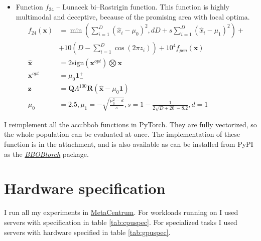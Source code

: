 \begin{itemize}
\begin{align*}
\begin{array}{ll}
\begin{array}{l}
                        \text{sampled randomly without} \\
                        \text{replacement for}\ i \neq 1
                    \end{array}
            \end{array}
        \right.
    \end{align*}
    \item Function $f_{24}$ -- Lunacek bi--Rastrigin function. This function is highly multimodal and deceptive, because of the promising area with local optima.
    \begin{align*}
        f_{24}\left(\mathbf{x}\right) &=
            \min\left( \sum_{i=1}^D\left(\hat{x}_i-\mu_0\right)^2, dD+s\sum_{i=1}^D\left(\hat{x}_i-\mu_1\right)^2 \right) + \\
            &+ 10\left(D-\sum_{i=1}^D \cos\left(2\pi z_i\right)\right)
            + 10^4 f_{pen}\left(\mathbf{x}\right) \\
        \hat{\mathbf{x}} &= 2 \text{sign}\left(\mathbf{x}^{opt}\right) \bigotimes \mathbf{x} \\
        \mathbf{x}^{opt} &= \mu_0 \mathbf{1}^{+}_{-} \\
        \mathbf{z} &= \mathbf{Q}\Lambda^{100}\mathbf{R}\left(\hat{\mathbf{x}}-\mu_0\mathbf{1}\right) \\
        \mu_0&=2.5,\mu_1=-\sqrt{\frac{\mu_0^2-d}{s}}, s=1-\frac{1}{2\sqrt{D+20}-8.2},d=1
    \end{align*}
\end{itemize}

I reimplement all the \acrshort{acc:bbob} functions in PyTorch. They are fully vectorized, so the whole population can be evaluated at once. The implementation of these function is in the attachment, and is also available as can be installed from PyPI as the \href{https://pypi.org/project/BBOBtorch/}{\textit{BBOBtorch}} package.




\section{Hardware specification}

I run all my experiments in \href{https://metavo.metacentrum.cz/en/}{MetaCentrum}. For workloads running on \cpu I used servers with specification in table \ref{tab:cpuspec}. For \gpu specialized tasks I used servers with hardware specified in table \ref{tab:gpuspec}.


